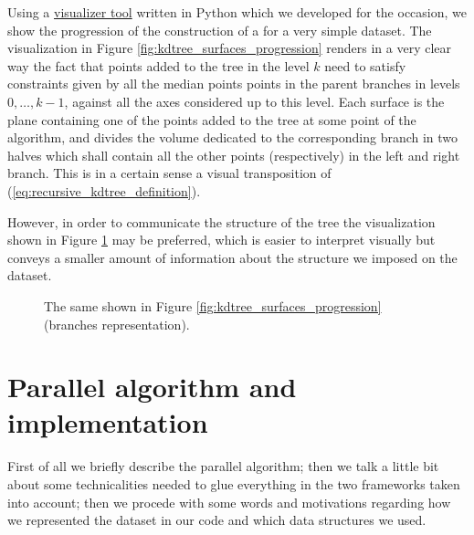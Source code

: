\documentclass{article}
\begin{document}
Using a
\href{https://github.com/fAndreuzzi/parallel-kd-tree/tree/master/visualization}{visualizer tool}
written in Python which we developed for the occasion, we show the progression
of the construction of a \kdtree{} for a very simple dataset. The visualization
in Figure \ref{fig:kdtree_surfaces_progression} renders in a
very clear way the fact that points added to the tree in the level $k$ need to
satisfy constraints given by all the median points points in the parent branches
in levels $0, \dots, k-1$, against all the axes considered up to this level.
Each surface is the plane containing one of the points
added to the tree at some point of the algorithm, and divides the volume
dedicated to the corresponding branch in two halves which shall contain all the
other points (respectively) in the left and right branch. This is in a certain
sense a visual transposition of (\ref*{eq:recursive_kdtree_definition}).

However, in order to communicate the structure of the tree
the visualization shown in Figure \ref{fig:kdtree_branches_progression} may be
preferred, which is easier to interpret visually but conveys a smaller amount
of information about the structure we imposed on the dataset.

\begin{figure}[t!]
    \caption{The same \kdtree{} shown in Figure \ref{fig:kdtree_surfaces_progression} (branches representation).}
    \label{fig:kdtree_branches_progression}
\end{figure}

\section{Parallel algorithm and implementation} \label{sec:algorithm}
First of all we briefly describe the parallel algorithm; then we talk a little
bit about some technicalities needed to glue everything in the two frameworks
taken into account; then we procede with some words and motivations regarding
how we represented the dataset in our code and which data structures we used.
\end{document}
